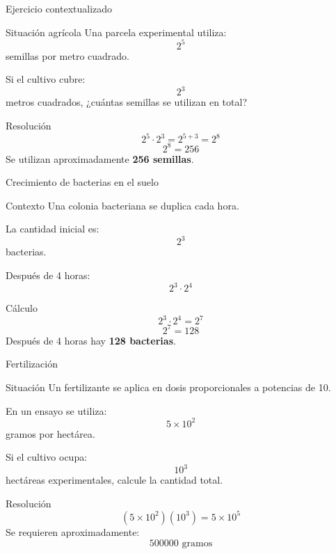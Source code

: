 \documentclass[aspectratio=169,10pt,handout]{beamer}
\begin{document}
	\begin{frame}{Ejercicio contextualizado}
		\begin{block}{Situación agrícola}
			Una parcela experimental utiliza:
			\[
			2^5
			\]
			semillas por metro cuadrado.
			
			Si el cultivo cubre:
			\[
			2^3
			\]
			metros cuadrados, ¿cuántas semillas se utilizan en total?
		\end{block}
		
		\pause
		
		\begin{exampleblock}{Resolución}
			\[
			2^5 \cdot 2^3 = 2^{5+3} = 2^8
			\]
			\[
			2^8 = 256
			\]
			Se utilizan aproximadamente \textbf{256 semillas}.
		\end{exampleblock}
	\end{frame}
	
	\begin{frame}{Crecimiento de bacterias en el suelo}
		\begin{block}{Contexto}
			Una colonia bacteriana se duplica cada hora.
			
			La cantidad inicial es:
			\[
			2^3
			\]
			bacterias.
			
			Después de 4 horas:
			\[
			2^3 \cdot 2^4
			\]
		\end{block}
		
		\pause
		
		\begin{exampleblock}{Cálculo}
			\[
			2^3 \cdot 2^4 = 2^{7}
			\]
			\[
			2^7 = 128
			\]
			Después de 4 horas hay \textbf{128 bacterias}.
		\end{exampleblock}
	\end{frame}
	
	\begin{frame}{Fertilización}
		\begin{block}{Situación}
			Un fertilizante se aplica en dosis proporcionales a potencias de 10.
			
			En un ensayo se utiliza:
			\[
			5\times10^2
			\]
			gramos por hectárea.
			
			Si el cultivo ocupa:
			\[
			10^3
			\]
			hectáreas experimentales, calcule la cantidad total.
		\end{block}
		
		\pause
		
		\begin{exampleblock}{Resolución}
			\[
			(5\times10^2)(10^3)=5\times10^{5}
			\]
			Se requieren aproximadamente:
			\[
			500000\text{ gramos}
			\]
		\end{exampleblock}
	\end{frame}
	
\end{document}
